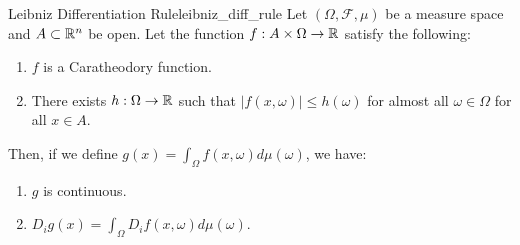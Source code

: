 \begin{proposition}{Leibniz Differentiation Rule}{leibniz_diff_rule}
	Let $(\Omega, \mathcal{F}, \mu)$ be a measure space and $A\subset\mathbb{R}^n$ be open. Let the function $f: A\times\Omega\to\mathbb{R}$ satisfy the following:
	\begin{enumerate}
		\item $f$ is a Caratheodory function.
		\item There exists $h: \Omega\to\mathbb{R}$ such that $|f(x, \omega)|\le h(\omega)$ for almost all $\omega\in\Omega$ for all $x\in A$.
	\end{enumerate}

	\noindent Then, if we define $g(x) = \int_\Omega f(x, \omega)d\mu(\omega)$, we have:
	\begin{enumerate}[label=(\roman*)]
		\item $g$ is continuous.
		\item $D_i g(x) = \int_\Omega D_i f(x, \omega)d\mu(\omega)$.
	\end{enumerate} 
\end{proposition} 

